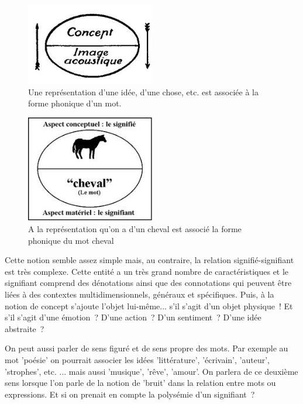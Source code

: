 \documentclass[a4paper,11pt,french]{article}
\begin{document}
\begin{figure}[h!]
  \centering
      \includegraphics[width=0.5\textwidth]{img/signe-conceptimageacoustique.jpeg}
  \caption{Une représentation d'une idée, d'une chose, etc. est associée à la forme phonique d'un mot.}
\end{figure}

\begin{figure}[h!]
  \centering
      \includegraphics[width=0.5\textwidth]{img/signe-cheval.jpeg}
  \caption{A la représentation qu'on a d'un cheval est associé la forme phonique du mot cheval}
\end{figure}

Cette notion semble assez simple mais, au contraire, la relation signifié-signifiant est très complexe. Cette entité a un très grand nombre de caractéristiques et le signifiant comprend des dénotations ainsi que des connotations qui peuvent être liées à des contextes multidimensionnels, généraux et spécifiques. Puis, à la notion de concept s'ajoute l'objet lui-même... s'il s'agit d'un objet physique~! Et s'il s'agit d'une émotion~? D'une action~? D'un sentiment~? D'une idée abstraite~? 

On peut aussi parler de sens figuré et de sens propre des mots. Par exemple au mot 'poésie' on pourrait associer les idées 'littérature', 'écrivain', 'auteur', 'strophes', etc. ... mais aussi 'musique', 'rêve', 'amour'. On parlera de ce deuxième sens lorsque l'on parle de la notion de 'bruit' dans la relation entre mots ou expressions. Et si on prenait en compte la polysémie d'un signifiant~?
\end{document}
